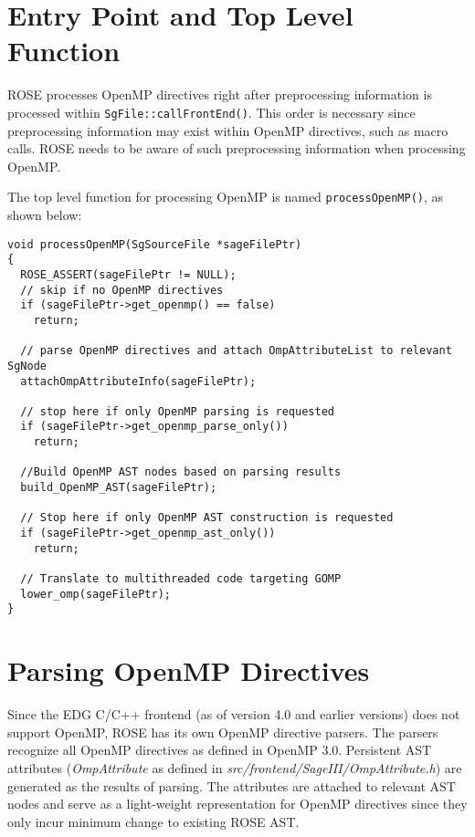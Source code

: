 \section{Entry Point and Top Level Function}
ROSE processes OpenMP directives right after preprocessing information is processed within \lstinline{SgFile::callFrontEnd()}.
This order is necessary since preprocessing information may exist within
OpenMP directives, such as macro calls.
ROSE needs to be aware of such preprocessing information when processing OpenMP.

The top level function for processing OpenMP is named \lstinline{processOpenMP()}, as shown below:
\lstset{language=C,basicstyle=\scriptsize,numbers=left}
\begin{lstlisting}
void processOpenMP(SgSourceFile *sageFilePtr)
{
  ROSE_ASSERT(sageFilePtr != NULL);
  // skip if no OpenMP directives
  if (sageFilePtr->get_openmp() == false)
    return;

  // parse OpenMP directives and attach OmpAttributeList to relevant SgNode
  attachOmpAttributeInfo(sageFilePtr);

  // stop here if only OpenMP parsing is requested
  if (sageFilePtr->get_openmp_parse_only())
    return;

  //Build OpenMP AST nodes based on parsing results
  build_OpenMP_AST(sageFilePtr);

  // Stop here if only OpenMP AST construction is requested
  if (sageFilePtr->get_openmp_ast_only())
    return;

  // Translate to multithreaded code targeting GOMP
  lower_omp(sageFilePtr);
}
\end{lstlisting}
\lstset{language=C,basicstyle=\small}

\section{Parsing OpenMP Directives}
Since the EDG C/C++ frontend (as of version 4.0 and earlier versions) does not support OpenMP, 
ROSE has its own OpenMP directive parsers. 
The parsers recognize all OpenMP directives as defined in OpenMP 3.0.
Persistent AST attributes (\emph{OmpAttribute} as defined in
\textit{src/frontend/SageIII/OmpAttribute.h}) are generated as the results
of parsing.
The attributes are attached to relevant AST nodes and serve as a light-weight representation for OpenMP directives since they only incur minimum change to existing ROSE AST.

